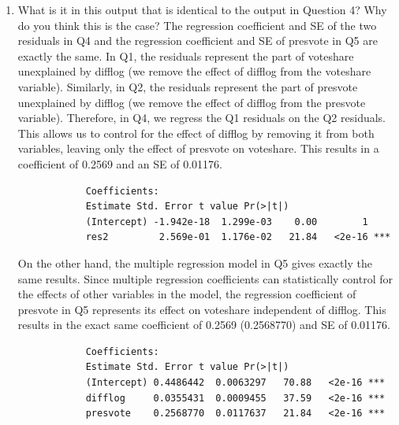\documentclass[12pt,letterpaper]{article}
\begin{document}
\begin{enumerate}
		
		\item What is it in this output that is identical to the output in Question 4? Why do you think this is the case?
		 \vspace{1cm}
		The regression coefficient and SE of the two residuals in Q4 and the regression coefficient and SE of presvote in Q5 are exactly the same.
		In Q1, the residuals represent the part of voteshare unexplained by difflog (we remove the effect of difflog from the voteshare variable). Similarly, in Q2, the residuals represent the part of presvote unexplained by difflog (we remove the effect of difflog from the presvote variable). Therefore, in Q4, we regress the Q1 residuals on the Q2 residuals. This allows us to control for the effect of difflog by removing it from both variables, leaving only the effect of presvote on voteshare. This results in a coefficient of 0.2569 and an SE of 0.01176.\newline
		\begin{verbatim}
			Coefficients:
			Estimate Std. Error t value Pr(>|t|)    
			(Intercept) -1.942e-18  1.299e-03    0.00        1    
			res2         2.569e-01  1.176e-02   21.84   <2e-16 ***
		\end{verbatim}
		On the other hand, the multiple regression model in Q5 gives exactly the same results. Since multiple regression coefficients can statistically control for the effects of other variables in the model, the regression coefficient of presvote in Q5 represents its effect on voteshare independent of difflog. This results in the exact same coefficient of 0.2569 (0.2568770) and SE of 0.01176.\newline
		\begin{verbatim}
			Coefficients:
			Estimate Std. Error t value Pr(>|t|)    
			(Intercept) 0.4486442  0.0063297   70.88   <2e-16 ***
			difflog     0.0355431  0.0009455   37.59   <2e-16 ***
			presvote    0.2568770  0.0117637   21.84   <2e-16 ***
		\end{verbatim}
	\end{enumerate}
\end{document}
